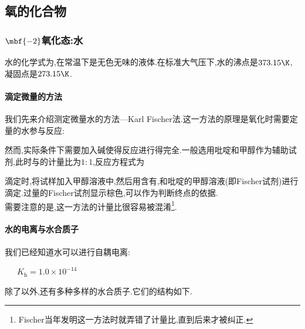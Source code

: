 \documentclass{ctexart}
\begin{document}
\subsection{氧的化合物}
\subsubsection{$\mbf{-2}$氧化态:水}
\begin{substance}[\ce{H2O}]
    水的化学式为,在常温下是无色无味的液体.在标准大气压下,水的沸点是$373.15\K$,凝固点是$273.15\K$.
\end{substance}
\paragraph{滴定微量的方法}
我们先来介绍测定微量水的方法—Karl Fischer法.这一方法的原理是氧化时需要定量的水参与反应:
\begin{center}
\end{center}
然而,实际条件下需要加入碱使得反应进行得完全.一般选用吡啶和甲醇作为辅助试剂,此时与的计量比为$1:1$,反应方程式为
\begin{center}
\end{center}
滴定时,将试样加入甲醇溶液中,然后用含有,和吡啶的甲醇溶液(即Fischer试剂)进行滴定.过量的Fischer试剂显示棕色,可以作为判断终点的依据.\\
\indent 需要注意的是,这一方法的计量比很容易被混淆\footnote{Fischer当年发明这一方法时就弄错了计量比,直到后来才被纠正.}.\paragraph{水的电离与水合质子}我们已经知道水可以进行自耦电离:
\begin{center}
    \ \ \ $K_\text{h}=1.0\times10^{-14}$
\end{center}
\indent 除了以外,还有多种多样的水合质子.它们的结构如下.
\end{document}
